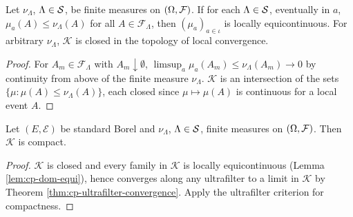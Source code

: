 \begin{lemma}
    \label{lem:cp-dom-equi}
    \leanok

    Let $\nu_\Lambda$, $\Lambda \in \mathcal{S}$, be finite measures on $(\Omega, \mathcal{F})$. If for
    each $\Lambda \in \mathcal{S}$, eventually in $a$, $\mu_a(A) \leq \nu_\Lambda(A)$ for all
    $A \in \mathcal{F}_\Lambda$, then $(\mu_a)_{a \in \iota}$ is locally equicontinuous.
    For arbitrary $\nu_\Lambda$, $\mathcal{K}$ is closed in the topology of local convergence.
\end{lemma}
\begin{proof}
    \leanok

    For $A_m \in \mathcal{F}_\Lambda$ with $A_m \downarrow \emptyset$,
    $\limsup_a \mu_a(A_m) \leq \nu_\Lambda(A_m) \to 0$ by continuity from above of the finite
    measure $\nu_\Lambda$. $\mathcal{K}$ is an intersection of the sets
    $\{\mu : \mu(A) \leq \nu_\Lambda(A)\}$, each closed since $\mu \mapsto \mu(A)$ is
    continuous for a local event $A$.
\end{proof}

\begin{corollary}[Georgii (4.10)]
    \label{cor:cp-410}
    \leanok

    Let $(E, \mathcal{E})$ be standard Borel and $\nu_\Lambda$, $\Lambda \in \mathcal{S}$, finite
    measures on $(\Omega, \mathcal{F})$. Then $\mathcal{K}$ is compact.
\end{corollary}
\begin{proof}
    \leanok

    $\mathcal{K}$ is closed and every family in $\mathcal{K}$ is locally equicontinuous
    (Lemma \ref{lem:cp-dom-equi}), hence converges along any ultrafilter to a limit in
    $\mathcal{K}$ by Theorem \ref{thm:cp-ultrafilter-convergence}. Apply the ultrafilter
    criterion for compactness.
\end{proof}

